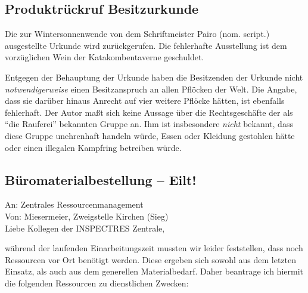 \subsection{Produktrückruf Besitzurkunde}
Die zur Wintersonnenwende von dem Schriftmeister Pairo (nom. script.) ausgestellte Urkunde wird zurückgerufen.
Die fehlerhafte Ausstellung ist dem vorzüglichen Wein der Katakombentaverne geschuldet.

Entgegen der Behauptung der Urkunde haben die Besitzenden der Urkunde nicht \textit{notwendigerweise} einen Besitzanspruch an allen Pflöcken der Welt.
Die Angabe, dass sie darüber hinaus Anrecht auf vier weitere Pflöcke hätten, ist ebenfalls fehlerhaft.
Der Autor maßt sich keine Aussage über die Rechtsgeschäfte der als \enquote{die Rauferei} bekannten Gruppe an.
Ihm ist insbesondere \textit{nicht} bekannt, dass diese Gruppe unehrenhaft handeln würde, Essen oder Kleidung gestohlen hätte oder einen illegalen Kampfring betreiben würde.


\subsection{Büromaterialbestellung -- Eilt!}
An: Zentrales Ressourcenmanagement \\
Von: Miesermeier, Zweigstelle Kirchen (Sieg) \\

\noindent
Liebe Kollegen der INSPECTRES Zentrale,

während der laufenden Einarbeitungszeit mussten wir leider feststellen, dass noch Ressourcen vor Ort benötigt werden.
Diese ergeben sich sowohl aus dem letzten Einsatz, als auch aus dem generellen Materialbedarf.
Daher beantrage ich hiermit die folgenden Ressourcen zu dienstlichen Zwecken:

